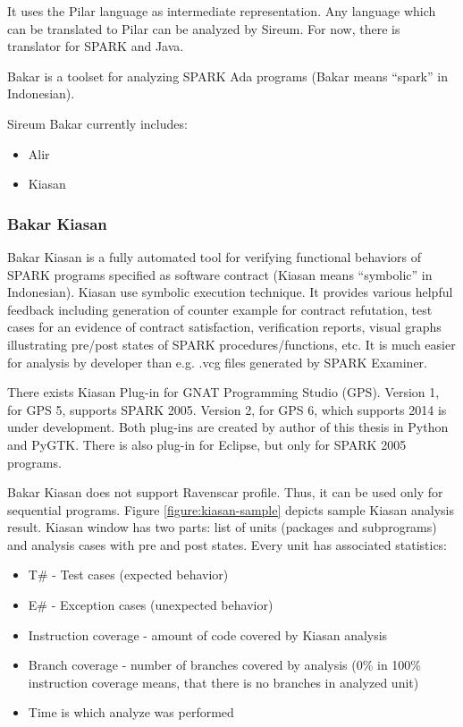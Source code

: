 It uses the Pilar language as intermediate representation. Any language which can be translated to Pilar can be analyzed by Sireum. For now, there is translator for SPARK and Java.

Bakar is a toolset for analyzing SPARK Ada programs (Bakar means “spark” in Indonesian).

Sireum Bakar currently includes:
\begin{itemize}
	\item Alir
	\item Kiasan
\end{itemize}


\subsubsection{Bakar Kiasan}

Bakar Kiasan \cite{Kiasan:Paper} is a fully automated tool for verifying functional behaviors of SPARK programs specified as software contract (Kiasan means “symbolic” in Indonesian). Kiasan use symbolic execution technique. It provides various helpful feedback including generation of counter example for contract refutation, test cases for an evidence of contract satisfaction, verification reports, visual graphs illustrating pre/post states of SPARK procedures/functions, etc. It is much easier for analysis by developer than e.g. .vcg files generated by SPARK Examiner.

There exists Kiasan Plug-in for GNAT Programming Studio (GPS). Version 1, for GPS 5, supports SPARK 2005. Version 2, for GPS 6, which supports 2014 is under development. Both plug-ins are created by author of this thesis in Python and PyGTK. There is also plug-in for Eclipse, but only for SPARK 2005 programs.

Bakar Kiasan does not support Ravenscar profile. Thus, it can be used only for sequential programs. Figure \ref{figure:kiasan-sample} depicts sample Kiasan analysis result. Kiasan window has two parts: list of units (packages and subprograms) and analysis cases with pre and post states. Every unit has associated statistics:
\begin{itemize}
	\item T\# - Test cases (expected behavior)
	\item E\# - Exception cases (unexpected behavior)
	\item Instruction coverage - amount of code covered by Kiasan analysis
	\item Branch coverage - number of branches covered by analysis (0\% in 100\% instruction coverage means, that there is no branches in analyzed unit)
	\item Time is which analyze was performed
\end{itemize}

